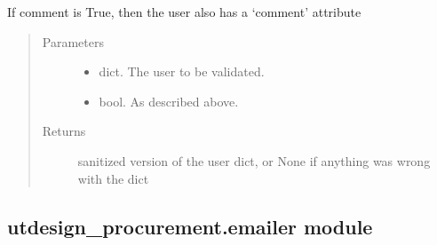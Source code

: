 \documentclass[letterpaper,10pt,english]{sphinxmanual}
\begin{document}
\begin{fulllineitems}
\begin{fulllineitems}
If comment is True, then the user also has a ‘comment’ attribute

\begin{sphinxVerbatim}[commandchars=\\\{\}]
 
            
     
       
       
       
\end{sphinxVerbatim}
\begin{quote}\begin{description}
\item[{Parameters}] \leavevmode\begin{itemize}
\item {} 
 \textendash{} dict. The user to be validated.

\item {} 
 \textendash{} bool. As described above.

\end{itemize}

\item[{Returns}] \leavevmode
sanitized version of the user dict, or None if anything was wrong with the dict

\end{description}\end{quote}

\end{fulllineitems}


\end{fulllineitems}



\subsection{utdesign\_procurement.emailer module}
\label{\detokenize{apidoc/utdesign_procurement:module-utdesign_procurement.emailer}}\label{\detokenize{apidoc/utdesign_procurement:utdesign-procurement-emailer-module}}
\end{document}
